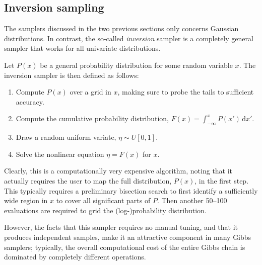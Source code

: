 \documentclass[twocolumn]{aa}
\newcommand{\x}[0]{\vec{x}}
\begin{document}



\subsection{Inversion sampling}
\label{sec:inversion}

The samplers discussed in the two previous sections only concerns
Gaussian distributions. In contrast, the so-called \emph{inversion}
sampler is a completely general sampler that works for all univariate
distributions. 

Let $P(x)$ be a general probability distribution for some random
variable $x$. The inversion sampler is then defined as follows:
\begin{enumerate}
  \item Compute $P(x)$ over a grid in $x$, making sure to probe the
    tails to sufficient accuracy.
  \item Compute the cumulative probability distribution, ${F(x) =
    \int_{-\infty}^{x} P(x')\,\mathrm dx'}$.
  \item Draw a random uniform variate, $\eta \sim U[0,1]$.
  \item Solve the nonlinear equation $\eta = F(x)$ for $x$.
\end{enumerate}

Clearly, this is a computationally very expensive algorithm, noting
that it actually requires the user to map the full distribution,
$P(x)$, in the first step. This typically requires a preliminary
bisection search to first identify a sufficiently wide region in $x$
to cover all significant parts of $P$. Then another 50--100
evaluations are required to grid the (log-)probability
distribution. 

However, the facts that this sampler requires no manual tuning, and
that it produces independent samples, make it an attractive component
in many Gibbs samplers; typically, the overall computational cost of
the entire Gibbs chain is dominated by completely different operations.
\end{document}
